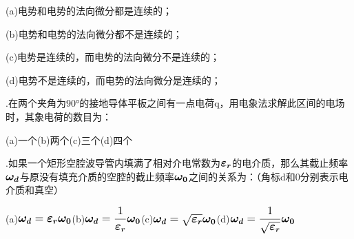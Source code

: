 (a)\hspace{0.6em}电势和电势的法向微分都是连续的；

(b)\hspace{0.6em}电势和电势的法向微分都不是连续的；

(c)\hspace{0.6em}电势是连续的，而电势的法向微分不是连续的；

(d)\hspace{0.6em}电势不是连续的，而电势的法向微分是连续的；
\vspace{0.2cm}

.\hspace{0.8em}在两个夹角为$\ang{90}$的接地导体平板之间有一点电荷q，用电象法求解此区间的电场时，其象电荷的数目为：\vspace{0.2cm}

(a)\hspace{0.6em}一个\hspace{1.6em}(b)\hspace{0.6em}两个\hspace{1.6em}(c)\hspace{0.6em}三个\hspace{1.6em}(d)\hspace{0.6em}四个
\vspace{0.2cm}

.\hspace{0.8em}如果一个矩形空腔波导管内填满了相对介电常数为$\large{\boldsymbol{\varepsilon_r}}$的电介质，那么其截止频率$\large{\boldsymbol{\omega_d}}$与原没有填充介质的空腔的截止频率$\large{\boldsymbol{\omega_0}}$之间的关系为：（角标d和0分别表示电介质和真空）

\vspace{0.4cm}
(a)\hspace{0.6em}$\large{\boldsymbol{\omega_d} = \boldsymbol{\varepsilon_r} \boldsymbol{\omega_0}}$\hspace{1.6em}(b)\hspace{0.6em}$\large{\boldsymbol{\omega_d} = \displaystyle{\frac{1}{\boldsymbol{\varepsilon_r}}} \boldsymbol{\omega_0}}$\hspace{1.6em}(c)\hspace{0.6em}$\large{\boldsymbol{\omega_d} = \sqrt{\boldsymbol{\varepsilon_r}} \boldsymbol{\omega_0}}$\hspace{1.6em}(d)\hspace{0.6em}$\large{\boldsymbol{\omega_d} = \displaystyle{\frac{1}{\sqrt{\boldsymbol{\varepsilon_r}}}} \boldsymbol{\omega_0}}$
\vspace{0.4cm}

